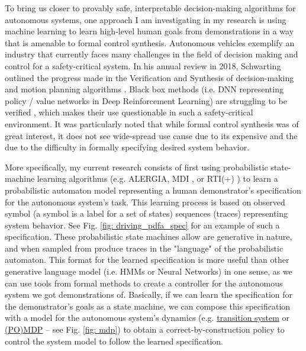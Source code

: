 To bring us closer to provably safe, interpretable decision-making algorithms for autonomous systems, one approach I am investigating in my research is using machine learning to learn high-level human goals from demonstrations in a way that is amenable to formal control synthesis. Autonomous vehicles exemplify an industry that currently faces many challenges in the field of decision making and control for a safety-critical system. In his annual review in 2018, Schwarting outlined the progress made in the Verification and Synthesis of decision-making and motion planning algorithms \cite{doi:10.1146/annurev-control-060117-105157}. Black box methods (i.e. DNN representing policy / value networks in Deep Reinforcement Learning) are struggling to be verified \cite{doi:10.1146/annurev-control-060117-105157}, which makes their use questionable in such a safety-critical environment. It was particularly noted that while formal control synthesis was of great interest, it does not see wide-spread use cause due to its expensive and the due to the difficulty in formally specifying desired system behavior.

More specifically, my current research consists of first using probabilistic state-machine learning algorithms (e.g. ALERGIA, MDI \cite{prob_state_merging_book}, or RTI(+) \cite{Verwer_PAutomaC}) to learn a probabilistic automaton model representing a human demonstrator's specification for the autonomous system's task. This learning process is based on observed symbol (a symbol is a label for a set of states) sequences (traces) representing system behavior. See Fig. \ref{fig: driving_pdfa_spec} for an example of such a specification. These probabilistic state machines allow are generative in nature, and when sampled from produce traces in the "language" of the probabilistic automaton. This format for the learned specification is more useful than other generative language model (i.e. HMMs or Neural Networks) in one sense, as we can use tools from formal methods to create a controller for the autonomous system we got demonstrations of. Basically, if we can learn the specification for the demonstrator's goals as a state machine, we can compose this specification with a model for the autonomous system's dynamics (e.g. \href{https://en.wikipedia.org/wiki/Transition_system}{transition system} or \href{https://en.wikipedia.org/wiki/Markov_decision_process}{(PO)MDP} -- see Fig. \ref{fig: mdp}) to obtain a correct-by-construction policy to control the system model to follow the learned specification.

